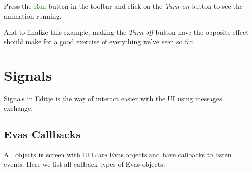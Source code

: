\documentclass[a4paper]{profusion}
\newcommand{\GUIButton}[1]{\textcolor{green}{#1}} %
\begin{document}
Press the \GUIButton {Run} button in the toolbar and click on the
\emph{Turn on} button to see the animation running.

And to finalize this example, making the \emph{Turn off} button have
the opposite effect should make for a good exercise of everything
we've seen so far.

\section{Signals}
\label{sec:signal_editing}

Signals in Editje is the way of interact easier with the UI using
messages exchange.

\subsection{Evas Callbacks}
All objects in screen with EFL are Evas objects and have callbacks to
listen events. Here we list all callback types of Evas objects:
\end{document}

